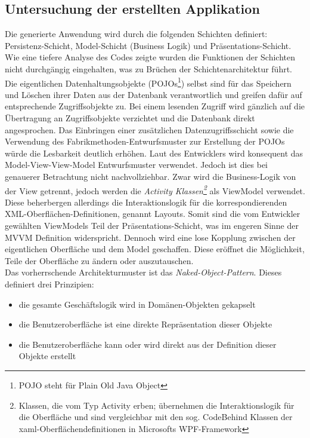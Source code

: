 \documentclass[a4paper,twoside]{article}
\begin{document}
\subsection{Untersuchung der erstellten Applikation}
\label{ssec:untApp}
Die generierte Anwendung wird durch die folgenden Schichten definiert: Persistenz-Schicht, Model-Schicht (Business Logik) und Präsentations-Schicht. Wie eine tiefere Analyse des Codes zeigte wurden die Funktionen der Schichten nicht durchgängig eingehalten, was zu Brüchen der Schichtenarchitektur führt. Die eigentlichen Datenhaltungsobjekte (POJOs\footnote{POJO steht für Plain Old Java Object}) selbst sind für das Speichern und Löschen ihrer Daten aus der Datenbank verantwortlich und greifen dafür auf entsprechende Zugriffsobjekte zu. Bei einem lesenden Zugriff wird gänzlich auf die Übertragung an Zugriffsobjekte verzichtet und die Datenbank direkt angesprochen. Das Einbringen einer zusätzlichen Datenzugriffsschicht sowie die Verwendung des Fabrikmethoden-Entwurfsmuster zur Erstellung der POJOs würde die Lesbarkeit deutlich erhöhen. %
Laut des Entwicklers wird konsequent das Model-View-View-Model Entwurfsmuster verwendet. Jedoch ist dies bei genauerer Betrachtung nicht nachvollziehbar. Zwar wird die Business-Logik von der View getrennt, jedoch werden die \textit{Activity Klassen\footnote{Klassen, die vom Typ Activity erben; übernehmen die Interaktionslogik für die Oberfläche und sind vergleichbar mit den sog. CodeBehind Klassen der xaml-Oberflächendefinitionen in Microsofts WPF-Framework }} als ViewModel verwendet. Diese beherbergen allerdings die Interaktionslogik für die korrespondierenden XML-Oberflächen-Definitionen, genannt Layouts. Somit sind die vom Entwickler gewählten ViewModels Teil der Präsentations-Schicht, was im engeren Sinne der MVVM Definition widerspricht.
Dennoch wird eine lose Kopplung zwischen der eigentlichen Oberfläche und dem Model geschaffen. Diese eröffnet die Möglichkeit, Teile der Oberfläche zu ändern oder auszutauschen.
\\

Das vorherrschende Architekturmuster ist das \textit{Naked-Object-Pattern}. Dieses definiert drei Prinzipien: \begin{itemize}
\item die gesamte Geschäftslogik wird in Domänen-Objekten gekapselt
\item die Benutzeroberfläche ist eine direkte Repräsentation dieser Objekte 
\item die Benutzeroberfläche kann oder wird direkt aus der Definition dieser Objekte erstellt
\end{itemize}
\end{document}

